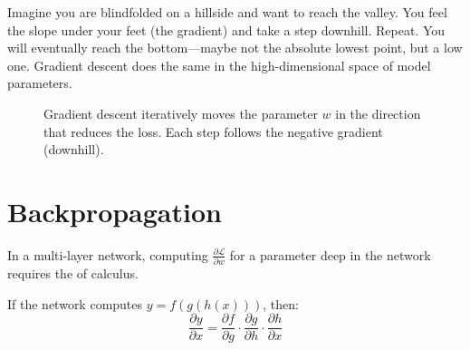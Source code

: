 \begin{analogy}
Imagine you are blindfolded on a hillside and want to reach the valley.
You feel the slope under your feet (the gradient) and take a step
downhill. Repeat. You will eventually reach the bottom---maybe not the
absolute lowest point, but a low one. Gradient descent does the same in
the high-dimensional space of model parameters.
\end{analogy}

\begin{figure}[htbp]
\centering
{}
\caption{Gradient descent iteratively moves the parameter $w$ in the
  direction that reduces the loss. Each step follows the negative
  gradient (downhill).}
\label{fig:gradient-descent}
\end{figure}


\section{Backpropagation}
\label{sec:backprop}

In a multi-layer network, computing $\frac{\partial \mathcal{L}}
{\partial w}$ for a parameter deep in the network requires the
 of calculus.

If the network computes $y = f(g(h(x)))$, then:
\begin{equation}
  \frac{\partial y}{\partial x} =
    \frac{\partial f}{\partial g} \cdot
    \frac{\partial g}{\partial h} \cdot
    \frac{\partial h}{\partial x}
  \label{eq:chain-rule}
\end{equation}

